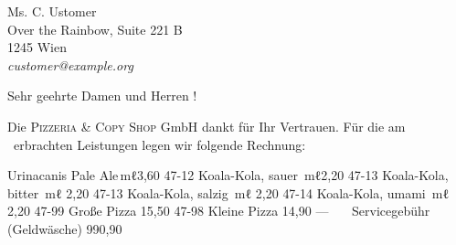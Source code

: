 \documentclass[fontsize=11pt,parskip=half]{scrlttr2}
\def\invoicenumber{\myfoo}
\begin{document}
	
					\def\payperiod		{14}	%
					\def\daysago		{2}		%
					\def\servicedate	{}		%
	\begin{letter}{%
						Ms. C. Ustomer\\
						Over the Rainbow, Suite 221\kern 1pt B\\
						1245 Wien\\[1ex]
						\hfill\emph{customer@example.org}
	}

		\opening{Sehr geehrte Damen und Herren\kern 1pt !}

		Die \textsc{Pizzeria \& Copy Shop} GmbH dankt für Ihr Vertrauen.
		Für die am \printservicedate\ erbrachten Leistungen legen wir folgende Rechnung:

			\AdvanceDate[\daysago]		%
			\vspace{1ex}\par			%

		\begin{invoice*}[N]				%
			\NumbersOn					%
			\SeparatorOff

			\makeatletter\renewcommand*{}\makeatother	

		{Urinacanis Pale Ale\,mℓ}{3,60}
	{47-12}		{Koala-Kola, sauer \,mℓ}{2,20}
	{47-13}		{Koala-Kola, bitter \,mℓ}	{2,20}
	{47-13}		{Koala-Kola, salzig \,mℓ}	{2,20}
	{47-14}		{Koala-Kola, umami \,mℓ}	{2,20}
	{47-99}		{Große Pizza}						{15,50}
	{47-98}		{Kleine Pizza}						{14,90}
	{---~~~}		{Servicegebühr (Geldwäsche)}		{990,90}
\enlargethispage{4\baselineskip}	%
		\end{invoice*}


\end{letter}
\end{document}
